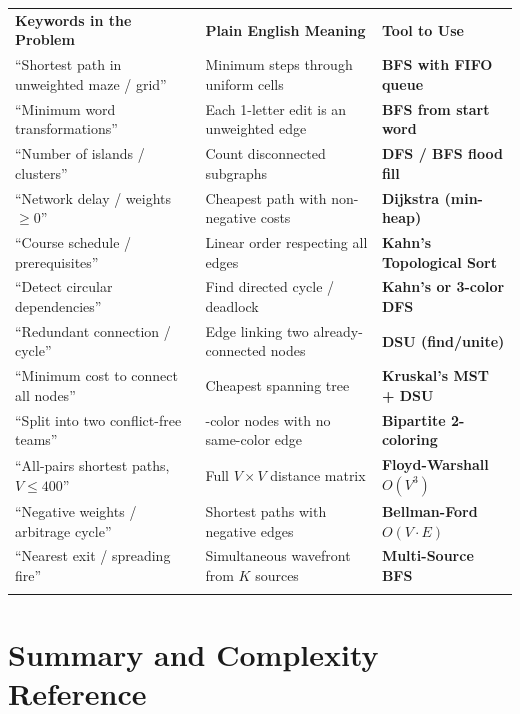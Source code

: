 \documentclass[11pt,a4paper]{article}
\theoremstyle{definition}
\begin{document}
\begingroup\small{}
\begin{tabularx}{\textwidth}{>{\raggedright\arraybackslash}p{4.3cm} >{\raggedright\arraybackslash}X >{\raggedright\arraybackslash\bfseries}p{4.1cm}}
\arrayrulecolor{primaryblue}\toprule[1.2pt]
\rowcolor{primaryblue!10}
\textcolor{primaryblue}{\textbf{Keywords in the Problem}} & \textcolor{primaryblue}{\textbf{Plain English Meaning}} & \textcolor{primaryblue}{\textbf{Tool to Use}} \\
\arrayrulecolor{codeframe}\midrule[0.6pt]
``Shortest path in unweighted maze / grid'' & Minimum steps through uniform cells & BFS with FIFO queue \\
``Minimum word transformations'' & Each 1-letter edit is an unweighted edge & BFS from start word \\
``Number of islands / clusters'' & Count disconnected subgraphs & DFS / BFS flood fill \\
``Network delay / weights $\ge 0$'' & Cheapest path with non-negative costs & Dijkstra (min-heap) \\
``Course schedule / prerequisites'' & Linear order respecting all edges & Kahn's Topological Sort \\
``Detect circular dependencies'' & Find directed cycle / deadlock & Kahn's or 3-color DFS \\
``Redundant connection / cycle'' & Edge linking two already-connected nodes & DSU (find/unite) \\
``Minimum cost to connect all nodes'' & Cheapest spanning tree & Kruskal's MST + DSU \\
``Split into two conflict-free teams'' & 2-color nodes with no same-color edge & Bipartite 2-coloring \\
``All-pairs shortest paths, $V \le 400$'' & Full $V \times V$ distance matrix & Floyd-Warshall $O(V^3)$ \\
``Negative weights / arbitrage cycle'' & Shortest paths with negative edges & Bellman-Ford $O(V \cdot E)$ \\
``Nearest exit / spreading fire'' & Simultaneous wavefront from $K$ sources & Multi-Source BFS \\
\arrayrulecolor{primaryblue}\bottomrule[1.2pt]
\end{tabularx}\endgroup

\section{Summary and Complexity Reference}
\end{document}
